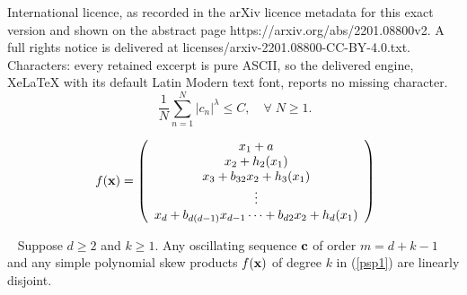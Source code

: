 \documentclass[10pt,a4paper]{amsart}
\begin{document}
International licence, as recorded in the arXiv licence metadata for this exact version and shown on the abstract page https://arxiv.org/abs/2201.08800v2. A full rights notice is delivered at licenses/arxiv-2201.08800-CC-BY-4.0.txt. Characters: every retained excerpt is pure ASCII, so the delivered engine, XeLaTeX with its default Latin Modern text font, reports no missing character.
 \begin{equation}~\label{cn}
\frac{1}{N} \sum_{n=1}^{N} |c_{n}|^{\lambda} \leq C, \quad \forall\; N\geq 1.
\end{equation}  

\begin{equation}~\label{psp1}
f ({\bf x})= \left(
\begin{array}{c}
x_{1}+ a\\
x_{2} +h_{2} (x_{1})\\
x_{3} +b_{32}x_{2} +h_{3}(x_{1})\\
\vdots\\
x_{d}+b_{d(d-1)}x_{d-1} \cdots +b_{d2}x_{2}+h_{d} (x_{1})
\end{array}\right)
\end{equation}

\begin{theorem}~\label{main}
Suppose $d\geq 2$ and $k\geq 1$. Any oscillating sequence ${\bf c}$ of order $m=d+k-1$ and any simple polynomial skew products $f ({\bf x})$ of degree $k$ in (\ref{psp1}) are linearly disjoint.
\end{theorem}
\end{document}
